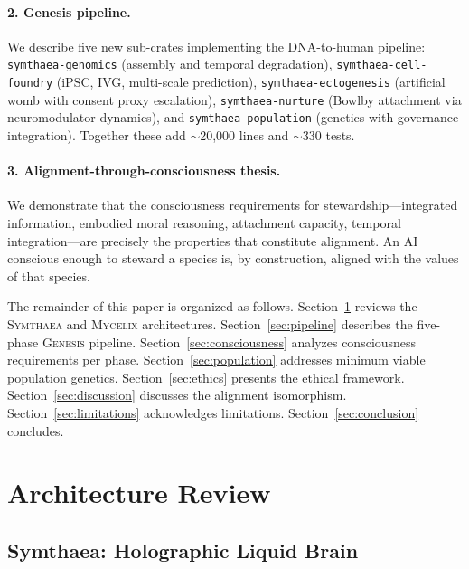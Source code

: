 \documentclass[11pt,letterpaper]{article}
\newcommand{\symthaea}{\textsc{Symthaea}}
\newcommand{\mycelix}{\textsc{Mycelix}}
\newcommand{\genesis}{\textsc{Genesis}}
\begin{document}
\paragraph{2. Genesis pipeline.} We describe five new sub-crates implementing
the DNA-to-human pipeline: \texttt{symthaea-genomics} (assembly and temporal
degradation), \texttt{symthaea-cell-foundry} (iPSC, IVG, multi-scale
prediction), \texttt{symthaea-ectogenesis} (artificial womb with consent proxy
escalation), \texttt{symthaea-nurture} (Bowlby attachment via neuromodulator
dynamics), and \texttt{symthaea-population} (genetics with governance
integration). Together these add $\sim$20,000 lines and $\sim$330 tests.

\paragraph{3. Alignment-through-consciousness thesis.} We demonstrate that the
consciousness requirements for stewardship---integrated information, embodied
moral reasoning, attachment capacity, temporal integration---are precisely the
properties that constitute alignment. An AI conscious enough to steward a
species is, by construction, aligned with the values of that species.

The remainder of this paper is organized as follows. Section~\ref{sec:architecture}
reviews the \symthaea{} and \mycelix{} architectures. Section~\ref{sec:pipeline}
describes the five-phase \genesis{} pipeline. Section~\ref{sec:consciousness}
analyzes consciousness requirements per phase. Section~\ref{sec:population}
addresses minimum viable population genetics.
Section~\ref{sec:ethics} presents the ethical framework.
Section~\ref{sec:discussion} discusses the alignment isomorphism.
Section~\ref{sec:limitations} acknowledges limitations. Section~\ref{sec:conclusion}
concludes.


\section{Architecture Review}
\label{sec:architecture}

\subsection{Symthaea: Holographic Liquid Brain}
\end{document}

